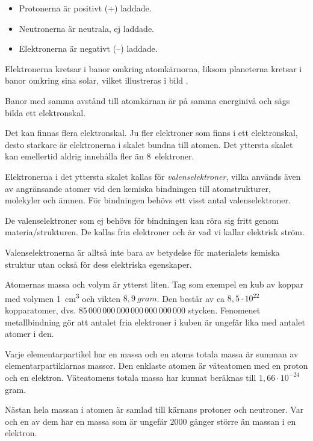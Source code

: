 \begin{itemize}
	\item Protonerna är positivt (+) laddade.
	\item Neutronerna är neutrala, ej laddade.
	\item Elektronerna är negativt (--) laddade.
\end{itemize}


Elektronerna kretsar i banor omkring atomkärnorna, liksom
planeterna kretsar i banor omkring sina solar, vilket illustreras i bild
.

Banor med samma avstånd till atomkärnan är på samma energinivå och sägs bilda
ett elektronskal.

Det kan finnas flera elektronskal.
Ju fler elektroner som finns i ett elektronskal, desto starkare är elektronerna
i skalet bundna till atomen.
Det yttersta skalet kan emellertid aldrig innehålla fler än 8~elektroner.

Elektronerna i det yttersta skalet kallas för \emph{valenselektroner}, vilka
används även av angränsande atomer vid den kemiska bindningen till
atomstrukturer, molekyler och ämnen.
För bindningen behövs ett visst antal valenselektroner.

De valenselektroner som ej behövs för bindningen kan röra sig fritt genom
materia/strukturen.
De kallas fria elektroner och är vad vi kallar elektrisk ström.

Valenselektronerna är alltså inte bara av betydelse för materialets kemiska
struktur utan också för dess elektriska egenskaper.

Atomernas massa och volym är ytterst liten.
Tag som exempel en kub av koppar med volymen \qty{1}{\cubic\centi\metre} och
vikten \(8,9\ gram\).
Den består av ca \(8,5 \cdot 10^{22}\) kopparatomer, dvs.
\(85\, 000\, 000\, 000\, 000\, 000\, 000\, 000\) stycken.
Fenomenet metallbindning gör att antalet fria elektroner i kuben är ungefär lika
med antalet atomer i den.

Varje elementarpartikel har en massa och en atoms totala massa är summan av
elementarpartiklarnas massor.
Den enklaste atomen är väteatomen med en proton och en elektron.
Väteatomens totala massa har kunnat beräknas till \(1,66 \cdot 10^{-24}\) gram.

Nästan hela massan i atomen är samlad till kärnans protoner och neutroner.
Var och en av dem har en massa som är ungefär 2000 gånger större än massan i en
elektron.

